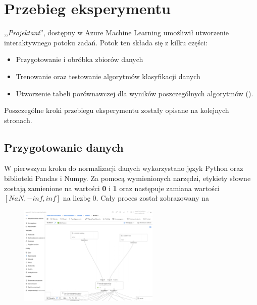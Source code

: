

\section{Przebieg eksperymentu}

,,\textit{Projektant}'', dostępny w Azure Machine Learning umożliwił utworzenie interaktywnego potoku zadań. Potok ten składa się z kilku części:
\begin{itemize}
    \item Przygotowanie i obróbka zbiorów danych
    \item Trenowanie oraz testowanie algorytmów klasyfikacji danych
    \item Utworzenie tabeli porównawczej dla wyników poszczególnych algorytmów ().
\end{itemize}

Poszczególne kroki przebiegu eksperymentu zostały opisane na kolejnych stronach.

\subsection{Przygotowanie danych}
W pierwszym kroku do normalizacji danych wykorzystano język Python oraz biblioteki Pandas i Numpy. Za pomocą wymienionych narzędzi, etykiety słowne zostają zamienione na wartości \textbf{0} i \textbf{1} oraz następuje zamiana wartości $[NaN, -inf, inf]$ na liczbę $0$. Cały proces został zobrazowany na 

\begin{figure}[H]
    \centering
    \includegraphics[width=0.6\textwidth]{images/data_pipe}
    \label{fig:norm}
\end{figure}

